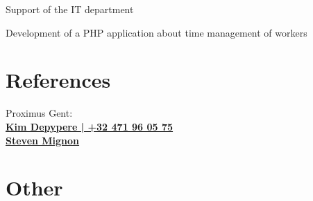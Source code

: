 \documentclass[a4paper]{deedy-resume} %
\begin{document}
\begin{minipage}[t]{0.60\textwidth}
\begin{tightitemize}
\item Support of the IT department
\item Development of a PHP application about time management of workers
\end{tightitemize}

\sectionspace %




\sectionspace %


\section{References}
Proximus Gent: \\
\href{https://be.linkedin.com/in/kimdepypere}{\bf Kim Depypere | +32 471 96 05 75}\\
\href{https://www.linkedin.com/in/steven-mignon-79b48629}{\bf Steven Mignon}

\section{Other} 


\sectionspace %


\end{minipage} %



\end{document}
